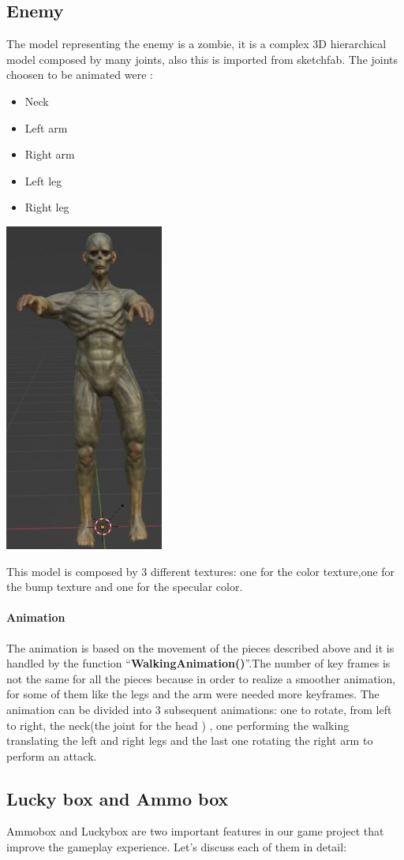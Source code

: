 \documentclass[12pt,a4paper,oneside]{article}
\theoremstyle{definition}
\begin{document}
\subsection{Enemy}
The model representing the enemy is a zombie, it is a complex 3D hierarchical model composed by many joints, also this is imported from sketchfab. The joints choosen to be animated were :

\begin{multicols}{2}
\begin{itemize}
    \item Neck
    \item Left arm
    \item Right arm
    \item Left leg
    \item Right leg    
\end{itemize}\par 
    \includegraphics[width=.2\textwidth,center]{figures/zombie.jpg} \par 
    \end{multicols}
This model is composed by 3 different textures: one for the color texture,one for the bump texture and one for the specular color.
\paragraph{Animation}  The animation is based on the movement of the pieces described above and it is handled by the function ``\textbf{WalkingAnimation()}''.The number of key frames is not the same for all the pieces because in order to realize a smoother animation, for some of them like the legs and the arm were needed more keyframes. The animation can be divided into 3 subsequent animations: one to rotate, from left to right, the neck(the joint for the head ) , one performing the walking translating the left and right legs and the last one rotating the right arm to perform an attack.


\subsection{Lucky box and Ammo box}
Ammobox and Luckybox are two important features in our game project that improve the gameplay experience. Let's discuss each of them in detail:
\end{document}
